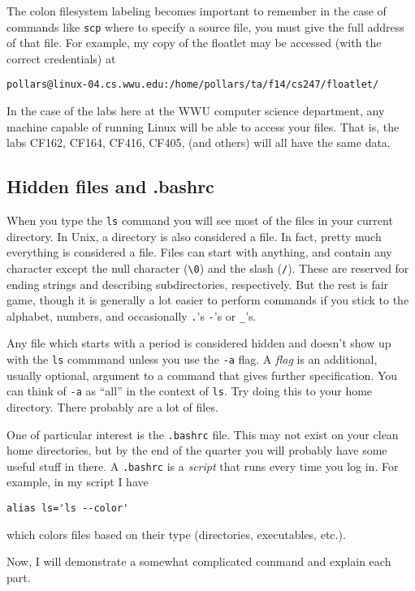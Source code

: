 \documentclass[12pt]{article}
\begin{document}
The colon filesystem labeling becomes important to remember in the case of commands like \verb|scp| where to specify a source file, you must give the full address of that file. For example, my copy of the floatlet may be accessed (with the correct credentials) at
\begin{verbatim}
pollars@linux-04.cs.wwu.edu:/home/pollars/ta/f14/cs247/floatlet/
\end{verbatim}

In the case of the labs here at the WWU computer science department, any machine capable of running Linux will be able to access your files. That is, the labs CF162, CF164, CF416, CF405, (and others) will all have the same data.

\subsection{Hidden files and .bashrc}
When you type the \verb|ls| command you will see most of the files in your current directory. In Unix, a directory is also considered a file. In fact, pretty much everything is considered a file. Files can start with anything, and contain any character except the null character (\verb|\0|) and the slash (\verb|/|). These are reserved for ending strings and describing subdirectories, respectively. But the rest is fair game, though it is generally a lot easier to perform commands if you stick to the alphabet, numbers, and occasionally \verb|.|'s \verb|-|'s or \verb|_|'s.

Any file which starts with a period is considered hidden and doesn't show up with the \verb|ls| commmand unless you use the \verb|-a| flag. A \emph{flag} is an additional, usually optional, argument to a command that gives further specification. You can think of \verb|-a| as ``all'' in the context of \verb|ls|. Try doing this to your home directory. There probably are a lot of files.

One of particular interest is the \verb|.bashrc| file. This may not exist on your clean home directories, but by the end of the quarter you will probably have some useful stuff in there. A \verb|.bashrc| is a \emph{script} that runs every time you log in. For example, in my script I have 
\begin{verbatim}
alias ls='ls --color'
\end{verbatim}
which colors files based on their type (directories, executables, etc.).

Now, I will demonstrate a somewhat complicated command and explain each part.
\end{document}
